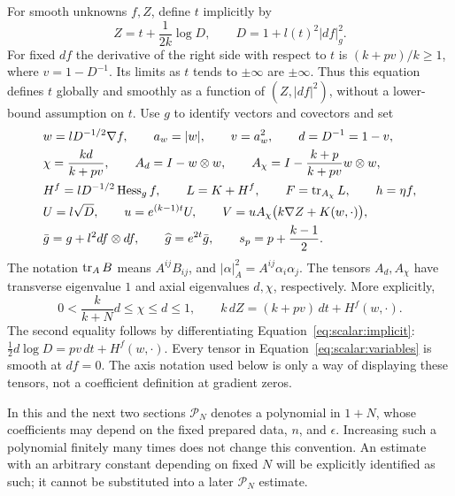 For smooth unknowns $f,Z$, define $t$ implicitly by
\begin{equation}
 Z=t+\frac{1}{2k}\log D,\qquad D=1+l(t)^2|df|_g^2.
 \label{eq:scalar:implicit}
\end{equation}
For fixed $df$ the derivative of the right side with respect to $t$
is $(k+pv)/k\geq1$, where $v=1-D^{-1}$.  Its limits as $t$ tends to
$\pm\infty$ are $\pm\infty$.  Thus this equation defines $t$ globally
and smoothly as a function of $(Z,|df|^2)$, without a lower-bound
assumption on $t$.  Use $g$ to identify vectors and covectors and set
\begin{equation}
 \begin{aligned}
 &w=lD^{-1/2}\nabla f,\qquad a_w=|w|,\qquad v=a_w^2,\qquad d=D^{-1}=1-v,\\
 &\chi=\frac{kd}{k+pv},\qquad
 A_d=I-w\otimes w,\qquad
 A_\chi=I-\frac{k+p}{k+pv}w\otimes w,\\
 &H^f=lD^{-1/2}\operatorname{Hess}_g f,\qquad L=K+H^f,\qquad
 F=\operatorname{tr}_{A_\chi}L,\qquad h=\eta f,\\
 &U=l\sqrt D,\qquad u=e^{(k-1)t}U,\qquad
 V=uA_\chi\bigl(k\nabla Z+K(w,\cdot)\bigr),\\
 &\bar g=g+l^2df\otimes df,\qquad \widehat g=e^{2t}\bar g,
 \qquad s_p=p+\frac{k-1}{2}.
 \end{aligned}
 \label{eq:scalar:variables}
\end{equation}
The notation $\operatorname{tr}_A B$ means $A^{ij}B_{ij}$, and
$|\alpha|_A^2=A^{ij}\alpha_i\alpha_j$.  The tensors $A_d,A_\chi$
have transverse eigenvalue $1$ and axial eigenvalues $d,\chi$,
respectively.  More explicitly,
\begin{equation}
 0<\frac{k}{k+N}d\leq\chi\leq d\leq1,
 \qquad
 k\,dZ=(k+pv)\,dt+H^f(w,\cdot).
 \label{eq:scalar:differential}
\end{equation}
The second equality follows by differentiating
Equation~\eqref{eq:scalar:implicit}:
$\tfrac12d\log D=pv\,dt+H^f(w,\cdot)$.
Every tensor in Equation~\eqref{eq:scalar:variables} is smooth at
$df=0$.  The axis notation used below is only a way of displaying
these tensors, not a coefficient definition at gradient zeros.

In this and the next two sections $\mathcal P_N$ denotes a polynomial
in $1+N$, whose coefficients may depend on the fixed prepared data,
$n$, and $\epsilon$.  Increasing such a polynomial finitely many times
does not change this convention.  An estimate with an arbitrary
constant depending on fixed $N$ will be explicitly identified as such;
it cannot be substituted into a later $\mathcal P_N$ estimate.

